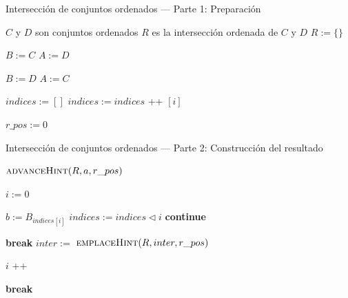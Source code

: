 \begin{algorithm}
\caption{Intersección de conjuntos ordenados — Parte 1: Preparación}\label{alg:int-ord-1}
\begin{algorithmic}[1]
\Require $C$ y $D$ son conjuntos ordenados
\Ensure $R$ es la intersección ordenada de $C$ y $D$
    \State $R := \{\}$

        \State {}
    \EndIf

        \State {}
    \EndIf
 
    
        \State {}
    \EndIf

    
    \State $B := C$
    \State $A := D$

        \State $B := D$
        \State $A := C$
    \EndIf

    \State $indices := []$ 
        \State $indices := indices$  \!+\!+  $[i]$ 
    \EndFor

    
    \State $r\_pos := 0$
\EndFunction
\end{algorithmic}
\end{algorithm}


\begin{algorithm}
\caption{Intersección de conjuntos ordenados — Parte 2: Construcción del resultado}\label{alg:int-ord-2}
\begin{algorithmic}[1]
        \State $\Call{advanceHint}{R,a,r\_pos}$

        \State $i := 0$
                
                
            \State $b := B_{indices[i]}$
                \State $indices := indices 	\triangleleft  i$
                \State \textbf{continue}
            \EndIf

                \State \textbf{break}
            \EndIf
                \State $inter :=$ 
                    \State $\Call{emplaceHint}{R,inter,r\_pos}$
                \EndIf
            \EndIf
    
            \State $i$ \!+\!+ 
        \EndWhile
        
            \State \textbf{break}
        \EndIf
    \EndFor
    \State {}
\EndFunction
\end{algorithmic}
\end{algorithm}



